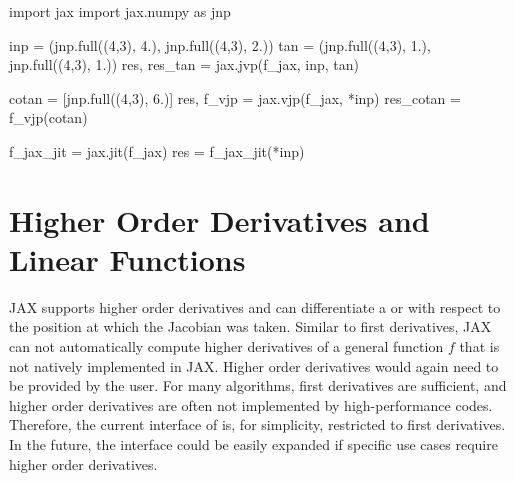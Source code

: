 \documentclass[10pt,a4paper,onecolumn]{article}
\let\textttOrig=\texttt
\def\texttt#1{\expandafter\textttOrig{\seqsplit{#1}}}
\newenvironment{Shaded}{}{}
\newcommand{\DecValTok}[1]{\textcolor[rgb]{0.25,0.63,0.44}{#1}}
\newcommand{\FloatTok}[1]{\textcolor[rgb]{0.25,0.63,0.44}{#1}}
\newcommand{\ImportTok}[1]{#1}
\newcommand{\NormalTok}[1]{#1}
\newcommand{\OperatorTok}[1]{\textcolor[rgb]{0.40,0.40,0.40}{#1}}
\begin{document}
\begin{Shaded}
\begin{Highlighting}[]
\ImportTok{import}\NormalTok{ jax}
\ImportTok{import}\NormalTok{ jax.numpy }\ImportTok{as}\NormalTok{ jnp}

\NormalTok{inp }\OperatorTok{=}\NormalTok{ (jnp.full((}\DecValTok{4}\NormalTok{,}\DecValTok{3}\NormalTok{), }\FloatTok{4.}\NormalTok{), jnp.full((}\DecValTok{4}\NormalTok{,}\DecValTok{3}\NormalTok{), }\FloatTok{2.}\NormalTok{))}
\NormalTok{tan }\OperatorTok{=}\NormalTok{ (jnp.full((}\DecValTok{4}\NormalTok{,}\DecValTok{3}\NormalTok{), }\FloatTok{1.}\NormalTok{), jnp.full((}\DecValTok{4}\NormalTok{,}\DecValTok{3}\NormalTok{), }\FloatTok{1.}\NormalTok{))}
\NormalTok{res, res\_tan }\OperatorTok{=}\NormalTok{ jax.jvp(f\_jax, inp, tan)}

\NormalTok{cotan }\OperatorTok{=}\NormalTok{ [jnp.full((}\DecValTok{4}\NormalTok{,}\DecValTok{3}\NormalTok{), }\FloatTok{6.}\NormalTok{)]}
\NormalTok{res, f\_vjp }\OperatorTok{=}\NormalTok{ jax.vjp(f\_jax, }\OperatorTok{*}\NormalTok{inp)}
\NormalTok{res\_cotan }\OperatorTok{=}\NormalTok{ f\_vjp(cotan)}

\NormalTok{f\_jax\_jit }\OperatorTok{=}\NormalTok{ jax.jit(f\_jax)}
\NormalTok{res }\OperatorTok{=}\NormalTok{ f\_jax\_jit(}\OperatorTok{*}\NormalTok{inp)}
\end{Highlighting}
\end{Shaded}

\hypertarget{higher-order-derivatives-and-linear-functions}{%
\section{Higher Order Derivatives and Linear
Functions}\label{higher-order-derivatives-and-linear-functions}}

JAX supports higher order derivatives and can differentiate a
\texttt{jvp} or \texttt{vjp} with respect to the position at which the
Jacobian was taken. Similar to first derivatives, JAX can not
automatically compute higher derivatives of a general function \(f\)
that is not natively implemented in JAX. Higher order derivatives would
again need to be provided by the user. For many algorithms, first
derivatives are sufficient, and higher order derivatives are often not
implemented by high-performance codes. Therefore, the current interface
of \texttt{JAXbind} is, for simplicity, restricted to first derivatives.
In the future, the interface could be easily expanded if specific use
cases require higher order derivatives.
\end{document}
